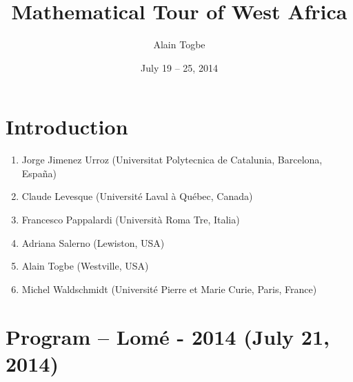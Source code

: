 \documentclass[a4paper,10pt]{article}
\title{Mathematical Tour of West Africa}
\author{Alain Togbe}
\date{July 19 -- 25, 2014}
\begin{document}
\maketitle

\section{Introduction}

\begin{enumerate}
 \item Jorge Jimenez Urroz (Universitat Polytecnica de Catalunia, Barcelona, Espa\~na)
 \item Claude Levesque (Universit\'e Laval \`a Qu\'ebec, Canada)
 \item Francesco Pappalardi (Universit\`a Roma Tre, Italia)
 \item Adriana Salerno (Lewiston, USA)
 \item Alain Togbe (Westville, USA)
 \item Michel Waldschmidt (Universit\'e Pierre et Marie Curie, Paris, France)
\end{enumerate}


\section{Program – Lom\'e - 2014 (July 21, 2014)}
\end{document}
